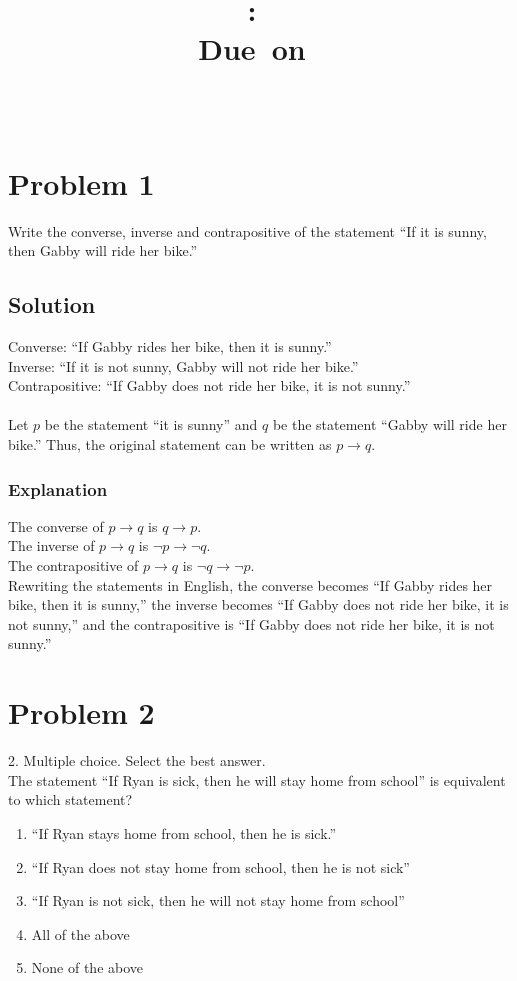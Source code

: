 \documentclass[table]{article}
\title{
    \vspace{2in}
    \textmd{\textbf{\hmwkClass:\ \hmwkTitle}}\\
    \normalsize\vspace{0.1in}\small{Due\ on\ \hmwkDueDate}\\
    \vspace{0.1in}\large{\textit{\hmwkClassInstructor\ \hmwkClassTime}}
    \vspace{3in}
}
\author{\hmwkAuthorName}
\date{}
\begin{document}
\maketitle
\pagebreak
\section{Problem 1}
Write the converse, inverse and contrapositive of the statement ``If it is sunny, then Gabby
will ride her bike.''
\subsection{Solution}
Converse: ``If Gabby rides her bike, then it is sunny.''\\
Inverse: ``If it is not sunny, Gabby will not ride her bike.''\\
Contrapositive: ``If Gabby does not ride her bike, it is not sunny.''\\~\\
Let $p$ be the statement ``it is sunny'' and $q$ be the statement ``Gabby will ride her bike.'' Thus, the original statement can be written as $p \rightarrow q$.
\subsubsection{Explanation}
The converse of $p \rightarrow q$ is $q \rightarrow p$.\\
The inverse of $p \rightarrow q$ is $\neg p \rightarrow \neg q$.\\
The contrapositive of $p \rightarrow q$ is $\neg q \rightarrow \neg p$.\\
Rewriting the statements in English, the converse becomes ``If Gabby rides her bike, then it is sunny,'' the inverse becomes ``If Gabby does not ride her bike, it is not sunny,'' and the contrapositive is ``If Gabby does not ride her bike, it is not sunny.''
\section{Problem 2}
2. Multiple choice. Select the best answer.\\
The statement ``If Ryan is sick, then he will stay home from school'' is equivalent to which
statement?
\begin{enumerate}[nosep,label=\alph*)]
\item ``If Ryan stays home from school, then he is sick.''
\item ``If Ryan does not stay home from school, then he is not sick''
\item ``If Ryan is not sick, then he will not stay home from school''
\item All of the above
\item None of the above
\end{enumerate}
\end{document}
